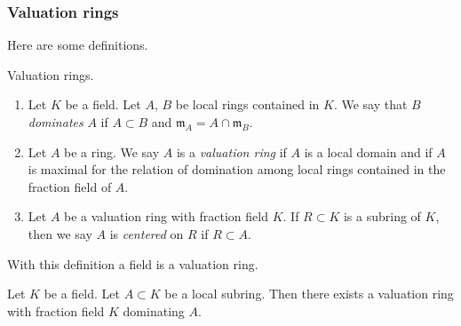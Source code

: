 \subsubsection{Valuation rings}
\label{editorial-source-section-valuation-rings}

\noindent
Here are some definitions.

\begin{definition}
\label{editorial-source-definition-valuation-ring}
Valuation rings.
\begin{enumerate}
\item Let $K$ be a field. Let $A$, $B$ be local rings contained
in $K$. We say that $B$ {\it dominates} $A$ if $A \subset B$
and $\mathfrak m_A = A \cap \mathfrak m_B$.
\item Let $A$ be a ring. We say $A$ is a {\it valuation ring}
if $A$ is a local domain and if $A$ is maximal
for the relation of domination among local rings contained in
the fraction field of $A$.
\item Let $A$ be a valuation ring with fraction field $K$.
If $R \subset K$ is a subring of $K$, then we say $A$
is {\it centered} on $R$ if $R \subset A$.
\end{enumerate}
\end{definition}

\noindent
With this definition a field is a valuation ring.

\begin{lemma}
\label{editorial-source-lemma-dominate}
Let $K$ be a field. Let $A \subset K$ be a local subring.
Then there exists a valuation ring with fraction field $K$
dominating $A$.
\end{lemma}

